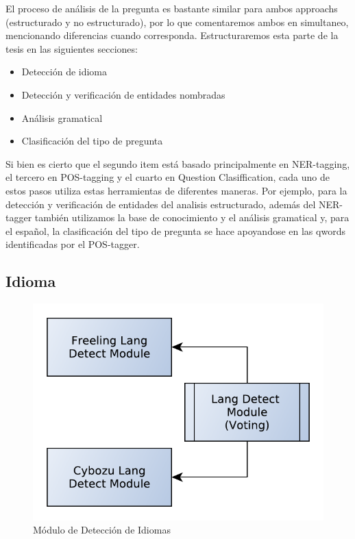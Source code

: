 El proceso de análisis de la pregunta es bastante similar para ambos approachs (estructurado y no estructurado), por lo
que comentaremos ambos en simultaneo, mencionando diferencias cuando corresponda. 
Estructuraremos esta parte de la tesis en las siguientes secciones:

\begin{itemize}
\item Detección de idioma 
\item Detección y verificación de entidades nombradas
\item Análisis gramatical
\item Clasificación del tipo de pregunta
\end{itemize}

Si bien es cierto que el segundo item está basado principalmente en NER-tagging, el tercero en POS-tagging y el cuarto en Question Clasiffication, 
cada uno de estos pasos utiliza estas herramientas de diferentes maneras. Por ejemplo, para la detección y verificación de entidades del analisis estructurado, además del NER-tagger también utilizamos la base de conocimiento y el análisis gramatical y, para el español, la clasificación del tipo de pregunta se hace apoyandose en las qwords identificadas por el POS-tagger.

\subsection{Idioma}

\begin{figure}
  \centering
    \includegraphics[scale=0.5]{graficos/LangDetect}
  \caption{Módulo de Detección de Idiomas}
  \label{fig:LangDetect}
\end{figure}


